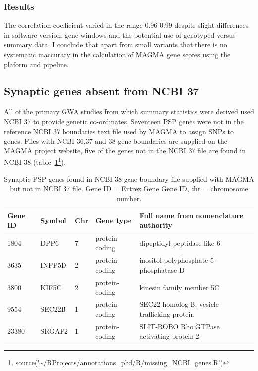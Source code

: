 \subsubsection{Results}
The correlation coefficient varied in the range 0.96-0.99 despite slight differences in software version, gene windows and the potential use of genotyped versus summary data. I conclude that apart from small variants that there is no systematic inaccuracy in the calculation of MAGMA gene scores using the plaform and pipeline. 


\subsection{Synaptic genes absent from NCBI 37}

All of the primary GWA studies from which summary statistics were derived used NCBI 37 to provide genetic co-ordinates. Seventeen PSP genes were not in the reference NCBI 37 boundaries text file used by MAGMA to assign SNPs to genes. Files with NCBI 36,37 and 38 gene boundaries are supplied on the MAGMA project website,  five of the genes not in the NCBI 37 file are found in NCBI 38 (table~\ref{tab:Synaptic PSP genes  found in NCBI 38 but not in 37 listing included with MAGMA}\footnote{\tiny\url{source('~/RProjects/annotations_phd/R/missing_NCBI_genes.R')}}).


\begin{table}[ht]
\centering
\setlength{\extrarowheight}{2pt}
\begin{adjustbox}{max width=\textwidth}
\begin{tabular}{lllll}
  \toprule
 Gene ID & Symbol & Chr & Gene type & Full name from nomenclature authority \\ 
  \midrule
1804 & DPP6 & 7 & protein-coding & dipeptidyl peptidase like 6 \\ 
  3635 & INPP5D & 2 & protein-coding & inositol polyphosphate-5-phosphatase D \\ 
  3800 & KIF5C & 2 & protein-coding & kinesin family member 5C \\ 
  9554 & SEC22B & 1 & protein-coding & SEC22 homolog B, vesicle trafficking protein \\ 
  23380 & SRGAP2 & 1 & protein-coding & SLIT-ROBO Rho GTPase activating protein 2 \\ 
   \bottomrule
\end{tabular}
\end{adjustbox}
\caption[Synaptic PSP genes with boundaries found only in NCBI 38]{Synaptic PSP genes  found in NCBI 38 gene boundary file supplied with MAGMA but not in NCBI 37 file. Gene ID = Entrez Gene Gene ID, chr = chromosome number.}
\label{tab:Synaptic PSP genes  found in NCBI 38 but not in 37 listing included with MAGMA}
\end{table}


